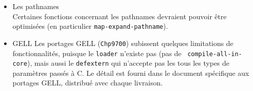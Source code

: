 \begin{itemize}
\item{Les pathnames}\\
Certaines fonctions concernant les pathnames devraient pouvoir \^{e}tre
optimis\'{e}es (en particulier {\tt map-expand-pathname}).
\item{GELL}
Les portages GELL ({\tt Chp9700}) subissent quelques limitations de
fonctionnalit\'{e}s, puisque le {\tt loader} n'existe pas (pas de {\tt
compile-all-in-core}), mais aussi le {\tt defextern} qui n'accepte pas
les tous les types de param\`{e}tres pass\'{e}s \`{a} C. Le d\'{e}tail est fourni
dans le document sp\'{e}cifique aux portages GELL, distribu\'{e} avec chaque
livraison. 
\end{itemize}


